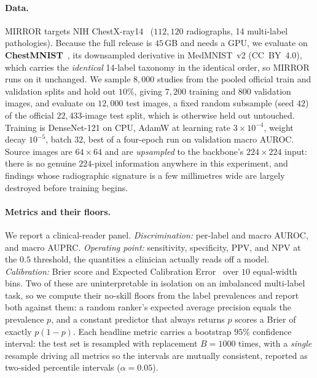 \documentclass[10pt,twocolumn]{article}
\begin{document}
\paragraph{Data.} MIRROR targets NIH ChestX-ray14~\cite{wang2017chestxray}
($112{,}120$ radiographs, 14 multi-label pathologies). Because the full release is
$45$\,GB and needs a GPU, we evaluate on \textbf{ChestMNIST}~\cite{yang2023medmnist},
its downsampled derivative in MedMNIST~v2 (CC~BY~4.0), which carries the
\emph{identical} 14-label taxonomy in the identical order, so MIRROR runs on it
unchanged. We sample $8{,}000$ studies from the pooled official train and
validation splits and hold out $10\%$, giving $7{,}200$ training and $800$
validation images, and evaluate on $12{,}000$ test images, a fixed random
subsample (seed $42$) of the official $22{,}433$-image test split, which is
otherwise held out untouched. Training is
DenseNet-121 on CPU, AdamW at learning rate $3\times10^{-4}$, weight decay
$10^{-5}$, batch $32$, best of a four-epoch run on validation macro AUROC. Source
images are $64\times64$ and are \emph{upsampled} to the backbone's $224\times224$
input: there is no genuine $224$-pixel information anywhere in this experiment,
and findings whose radiographic signature is a few millimetres wide are largely
destroyed before training begins.

\paragraph{Metrics and their floors.} We report a clinical-reader panel.
\emph{Discrimination:} per-label and macro AUROC, and macro AUPRC.
\emph{Operating point:} sensitivity, specificity, PPV, and NPV at the $0.5$
threshold, the quantities a clinician actually reads off a model.
\emph{Calibration:} Brier score and Expected Calibration
Error~\cite{guo2017calibration} over $10$ equal-width bins. Two of these are uninterpretable in isolation on an imbalanced
multi-label task, so we compute their no-skill floors from the label prevalences
and report both against them: a random ranker's expected average precision equals
the prevalence $p$, and a constant predictor that always returns $p$ scores a
Brier of exactly $p(1-p)$. Each headline metric carries a bootstrap $95\%$
confidence interval: the test set is resampled with replacement $B{=}1000$ times,
with a \emph{single} resample driving all metrics so the intervals are mutually
consistent, reported as two-sided percentile intervals ($\alpha{=}0.05$).
\end{document}
